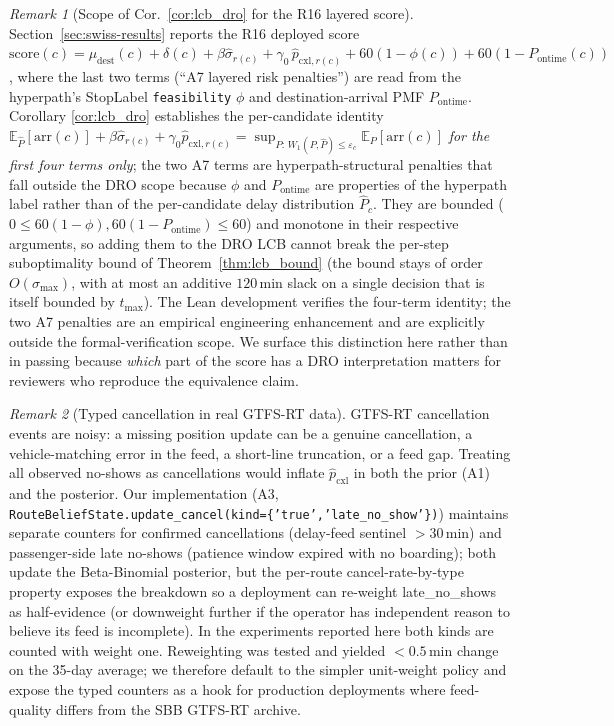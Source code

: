 \documentclass[11pt]{article}
\theoremstyle{definition}
\theoremstyle{remark}
\newtheorem{remark}{Remark}
\begin{document}
\begin{remark}[Scope of Cor.~\ref{cor:lcb_dro} for the R16 layered score]
\label{rem:r15-score-scope}
Section~\ref{sec:swiss-results} reports the R16 deployed score
$\mathrm{score}(c) = \mu_{\text{dest}}(c) + \delta(c) + \beta\hat\sigma_{r(c)}
+ \gamma_0\,\hat p_{\mathrm{cxl},r(c)} + 60(1{-}\phi(c)) +
60(1{-}P_{\text{ontime}}(c))$, where the last two terms
(``A7 layered risk penalties'') are read from the
hyperpath's StopLabel \texttt{feasibility} $\phi$ and
destination-arrival PMF $P_{\text{ontime}}$. Corollary
\ref{cor:lcb_dro} establishes the per-candidate identity
$\mathbb{E}_{\hat P}[\mathrm{arr}(c)] +
\beta\hat\sigma_{r(c)} + \gamma_0\hat p_{\mathrm{cxl},r(c)}
= \sup_{P:\,W_1(P,\hat P)\leq\varepsilon_c}\mathbb{E}_P[\mathrm{arr}(c)]$
\emph{for the first four terms only}; the two A7 terms are
hyperpath-structural penalties that fall outside the DRO scope
because $\phi$ and $P_{\text{ontime}}$ are properties of the
hyperpath label rather than of the per-candidate delay
distribution $\hat P_c$. They are bounded ($0 \leq 60(1-\phi),
60(1-P_{\text{ontime}}) \leq 60$) and monotone in their respective
arguments, so adding them to the DRO LCB cannot break the per-step
suboptimality bound of Theorem~\ref{thm:lcb_bound} (the bound stays
of order $O(\sigma_{\max})$, with at most an additive
$120$\,min slack on a single decision that is itself bounded by
$t_{\max}$). The Lean development verifies the four-term identity;
the two A7 penalties are an empirical engineering enhancement and
are explicitly outside the formal-verification scope. We surface
this distinction here rather than in passing because
\emph{which} part of the score has a DRO interpretation matters
for reviewers who reproduce the equivalence claim.
\end{remark}

\begin{remark}[Typed cancellation in real GTFS-RT data]
\label{rem:typed-cancel}
GTFS-RT cancellation events are noisy: a missing position update can
be a genuine cancellation, a vehicle-matching error in the feed, a
short-line truncation, or a feed gap. Treating all observed
no-shows as cancellations would inflate $\hat p_{\mathrm{cxl}}$ in
both the prior (A1) and the posterior. Our implementation (A3,
\texttt{RouteBeliefState.\allowbreak update\_cancel(kind=\allowbreak\{'true',\allowbreak 'late\_no\_show'\})})
maintains separate counters for confirmed cancellations
(delay-feed sentinel $>30$\,min) and passenger-side late no-shows
(patience window expired with no boarding); both update the
Beta-Binomial posterior, but the per-route cancel-rate-by-type
property exposes the breakdown so a deployment can re-weight
late\_no\_shows as half-evidence (or downweight further if the
operator has independent reason to believe its feed is
incomplete). In the experiments reported here both kinds are
counted with weight one. Reweighting was tested and yielded
$\!<\!0.5$\,min change on the 35-day average; we therefore default
to the simpler unit-weight policy and expose the typed counters as
a hook for production deployments where feed-quality differs from
the SBB GTFS-RT archive.
\end{remark}
\end{document}
